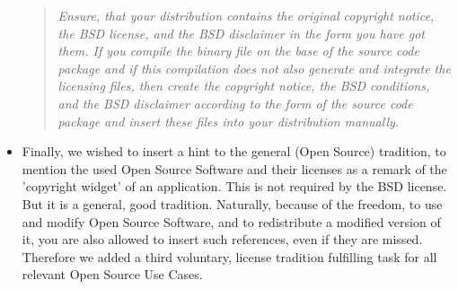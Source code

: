 \begin{itemize}
\begin{quote}\textit{Ensure, that your distribution contains the original
copyright notice, the BSD license, and the BSD disclaimer in the form you have
got them. If you compile the binary file on the base of the source code package
and if this compilation does not also generate and integrate the licensing
files, then create the copyright notice, the BSD conditions, and the BSD
disclaimer according to the form of the source code package and insert these
files into your distribution manually.}\end{quote}

\item Finally, we wished to insert a hint to the general (Open Source)
tradition, to mention the used Open Source Software and their licenses as a
remark of the 'copyright widget' of an application. This is not required by the
BSD license. But it is a general, good tradition. Naturally, because of the
freedom, to use and modify Open Source Software, and to redistribute a modified
version of it, you are also allowed to insert such references, even if they are
missed. Therefore we added a third voluntary, license tradition fulfilling task
for all relevant Open Source Use Cases.

\end{itemize}




%
